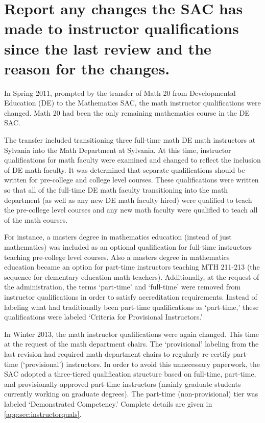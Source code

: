 \section{Report any changes the SAC has made to instructor qualifications since the last review and the reason for the changes.}
In Spring 2011, prompted by the transfer of Math 20 from Developmental Education (DE) to the Mathematics SAC, the math instructor qualifications were changed.  Math 20 had been the only remaining mathematics course in the DE SAC.  

The transfer included transitioning three full-time math DE math instructors at Sylvania into the Math Department at Sylvania.  At this time, instructor qualifications for math faculty were examined and changed to reflect the inclusion of DE math faculty.  It was determined that separate qualifications should be written for pre-college and college level courses.  These qualifications were written so that all of the full-time DE math faculty transitioning into the math department (as well as any new DE math faculty hired) were qualified to teach the pre-college level courses and any new math faculty were qualified to teach all of the math courses.  

For instance, a masters degree in mathematics education (instead of just mathematics) was included as an optional qualification for full-time instructors teaching pre-college level courses.  Also a masters degree in mathematics education became an option for part-time instructors teaching MTH 211-213 (the sequence for elementary education math teachers).  Additionally, at the request of the administration, the terms `part-time' and `full-time' were removed from instructor qualifications in order to satisfy accreditation requirements.  Instead of labeling what had traditionally been part-time qualifications as `part-time,' these qualifications were labeled `Criteria for Provisional Instructors.'

In Winter 2013, the math instructor qualifications were again changed.  This time at the request of the math department chairs.  The `provisional' labeling from the last revision had required math department chairs to regularly re-certify part-time (`provisional') instructors.  In order to avoid this unnecessary paperwork, the SAC adopted a three-tiered qualification structure based on full-time, part-time, and provisionally-approved part-time instructors (mainly graduate students currently working on graduate degrees).  The part-time (non-provisional) tier was labeled `Demonstrated Competency.' Complete details are given in \vref{app:sec:instructorquals}.
